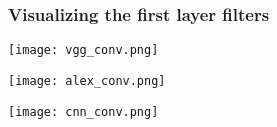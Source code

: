 \documentclass[../presentation.tex]{subfiles} %
\begin{document}
\begin{frame}
    \frametitle{Visualizing the first layer filters}
    \centering
    \begin{minipage}{0.3\textwidth}
        \centering
        \texttt{[image: vgg\_conv.png]}
    \end{minipage}
    \hfill
    \begin{minipage}{0.3\textwidth}
        \centering
        \texttt{[image: alex\_conv.png]}
    \end{minipage}
    
    \vspace{0.5cm} %
    
    \begin{minipage}{0.35\textwidth}
        \centering
        \texttt{[image: cnn\_conv.png]}
    \end{minipage}
\end{frame}
\end{document}
